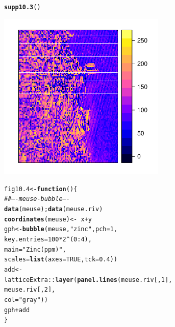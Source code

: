 \documentclass[12pt, a4paper,  BCOR=8.25mm, DIV=15]{scrartcl}\usepackage[]{graphicx}\usepackage[]{color}
\makeatletter
\newcommand{\hlnum}[1]{\textcolor[rgb]{0.686,0.059,0.569}{#1}}%
\newcommand{\hlstr}[1]{\textcolor[rgb]{0.192,0.494,0.8}{#1}}%
\newcommand{\hlcom}[1]{\textcolor[rgb]{0.678,0.584,0.686}{\textit{#1}}}%
\newcommand{\hlopt}[1]{\textcolor[rgb]{0,0,0}{#1}}%
\newcommand{\hlstd}[1]{\textcolor[rgb]{0.345,0.345,0.345}{#1}}%
\newcommand{\hlkwa}[1]{\textcolor[rgb]{0.161,0.373,0.58}{\textbf{#1}}}%
\newcommand{\hlkwb}[1]{\textcolor[rgb]{0.69,0.353,0.396}{#1}}%
\newcommand{\hlkwc}[1]{\textcolor[rgb]{0.333,0.667,0.333}{#1}}%
\newcommand{\hlkwd}[1]{\textcolor[rgb]{0.737,0.353,0.396}{\textbf{#1}}}%
\newenvironment{kframe}{%
 \def\at@end@of@kframe{}%
 \ifinner\ifhmode%
  \def\at@end@of@kframe{\end{minipage}}%
  \begin{minipage}{\columnwidth}%
 \fi\fi%
 \def\FrameCommand##1{\hskip\@totalleftmargin \hskip-\fboxsep
 \colorbox{shadecolor}{##1}\hskip-\fboxsep
     \hskip-\linewidth \hskip-\@totalleftmargin \hskip\columnwidth}%
 \MakeFramed {\advance\hsize-\width
   \@totalleftmargin\z@ \linewidth\hsize
   \@setminipage}}%
 {\par\unskip\endMakeFramed%
 \at@end@of@kframe}
\newenvironment{knitrout}{}{} %
\makeatother
\begin{document}
\begin{suppfigure}
\begin{knitrout}
\color{fgcolor}\begin{kframe}
\begin{alltt}
\hlkwd{supp10.3}\hlstd{()}
\end{alltt}
\end{kframe}

{\centering \includegraphics[width=0.6\textwidth]{figs/map-sp27-10_3-1} 

}



\end{knitrout}
\end{suppfigure}



\begin{knitrout}
\color{fgcolor}\begin{kframe}
\begin{alltt}
\hlstd{fig10.4} \hlkwb{<-} \hlkwa{function}\hlstd{()\{}
\hlcom{## ---- meuse-bubble ----}
\hlkwd{data}\hlstd{(meuse);} \hlkwd{data}\hlstd{(meuse.riv)}
\hlkwd{coordinates}\hlstd{(meuse)} \hlkwb{<-} \hlopt{~} \hlstd{x} \hlopt{+} \hlstd{y}
\hlstd{gph} \hlkwb{<-} \hlkwd{bubble}\hlstd{(meuse,} \hlstr{"zinc"}\hlstd{,} \hlkwc{pch}\hlstd{=}\hlnum{1}\hlstd{,}
              \hlkwc{key.entries} \hlstd{=}  \hlnum{100} \hlopt{*} \hlnum{2}\hlopt{^}\hlstd{(}\hlnum{0}\hlopt{:}\hlnum{4}\hlstd{),}
              \hlkwc{main} \hlstd{=} \hlstr{"Zinc(ppm)"}\hlstd{,}
              \hlkwc{scales}\hlstd{=}\hlkwd{list}\hlstd{(}\hlkwc{axes}\hlstd{=}\hlnum{TRUE}\hlstd{,} \hlkwc{tck}\hlstd{=}\hlnum{0.4}\hlstd{))}
\hlstd{add} \hlkwb{<-}
  \hlstd{latticeExtra}\hlopt{::}\hlkwd{layer}\hlstd{(}\hlkwd{panel.lines}\hlstd{(meuse.riv[,}\hlnum{1}\hlstd{],}
                                  \hlstd{meuse.riv[,}\hlnum{2}\hlstd{],}
                      \hlkwc{col}\hlstd{=}\hlstr{"gray"}\hlstd{))}
\hlstd{gph}\hlopt{+}\hlstd{add}
\hlstd{\}}
\end{alltt}
\end{kframe}
\end{knitrout}
\end{document}
